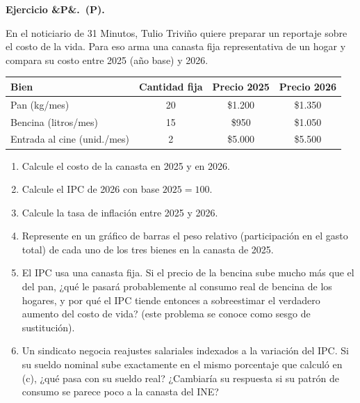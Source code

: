 \documentclass[11pt]{article}
\newcounter{ejercicio}
\newcommand{\ejercicio}[1][]{%
  \stepcounter{ejercicio}%
  \bigskip\noindent\textbf{Ejercicio \arabic{ejercicio}\ifx&#1&\relax.\else\ (#1).\fi}\ %
}
\newenvironment{partes}
  {\begin{enumerate}[label=(\alph*), leftmargin=1.5cm]}
  {\end{enumerate}}
\newenvironment{tabladatos}
  {\begin{center}}
  {\end{center}}
\begin{document}
\ejercicio[P]
En el noticiario de 31 Minutos, Tulio Triviño quiere preparar un reportaje sobre el costo de la vida. Para eso arma una canasta fija representativa de un hogar y compara su costo entre 2025 (año base) y 2026.

\begin{tabladatos}
\begin{tabular}{lccc}
\hline\hline
\textbf{Bien} & \textbf{Cantidad fija} & \textbf{Precio 2025} & \textbf{Precio 2026} \\
\hline
Pan (kg/mes) & 20 & \$1.200 & \$1.350 \\
Bencina (litros/mes) & 15 & \$950 & \$1.050 \\
Entrada al cine (unid./mes) & 2 & \$5.000 & \$5.500 \\
\hline\hline
\end{tabular}
\end{tabladatos}

\begin{partes}
  \item Calcule el costo de la canasta en 2025 y en 2026.
  \item Calcule el IPC de 2026 con base $2025=100$.
  \item Calcule la tasa de inflación entre 2025 y 2026.
  \item Represente en un gráfico de barras el peso relativo (participación en el gasto total) de cada uno de los tres bienes en la canasta de 2025.
  \item El IPC usa una canasta fija. Si el precio de la bencina sube mucho más que el del pan, ¿qué le pasará probablemente al consumo real de bencina de los hogares, y por qué el IPC tiende entonces a sobreestimar el verdadero aumento del costo de vida? (este problema se conoce como sesgo de sustitución).
  \item Un sindicato negocia reajustes salariales indexados a la variación del IPC. Si su sueldo nominal sube exactamente en el mismo porcentaje que calculó en (c), ¿qué pasa con su sueldo real? ¿Cambiaría su respuesta si su patrón de consumo se parece poco a la canasta del INE?
\end{partes}
\end{document}
